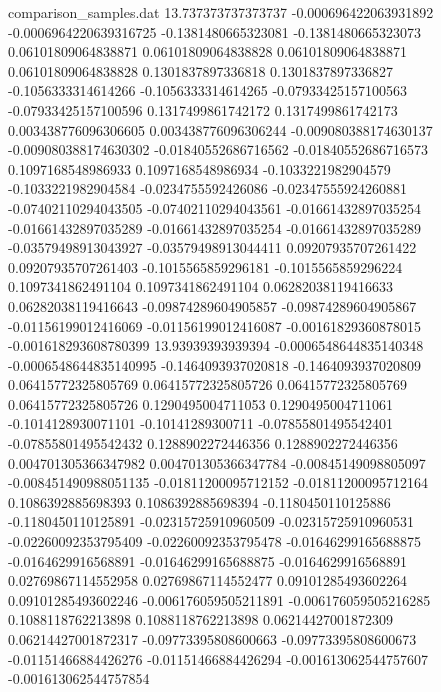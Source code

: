 \begin{filecontents}{comparison_samples.dat}
13.737373737373737  -0.000696422063931892   -0.0006964220639316725  -0.1381480665323081    -0.1381480665323073    0.06101809064838871    0.06101809064838828    0.06101809064838871    0.06101809064838828    0.1301837897336818     0.1301837897336827     -0.1056333314614266     -0.1056333314614265     -0.07933425157100563   -0.07933425157100596   0.1317499861742172      0.1317499861742173      0.003438776096306605    0.003438776096306244    -0.009080388174630137   -0.009080388174630302   -0.01840552686716562    -0.01840552686716573    0.1097168548986933      0.1097168548986934      -0.1033221982904579     -0.1033221982904584     -0.0234755592426086    -0.02347555924260881   -0.07402110294043505   -0.07402110294043561   -0.01661432897035254    -0.01661432897035289    -0.01661432897035254    -0.01661432897035289    -0.03579498913043927   -0.03579498913044411   0.09207935707261422     0.09207935707261403     -0.1015565859296181    -0.1015565859296224    0.1097341862491104      0.1097341862491104      0.06282038119416633     0.06282038119416643     -0.09874289604905857   -0.09874289604905867   -0.01156199012416069   -0.01156199012416087   -0.00161829360878015    -0.001618293608780399 
13.93939393939394   -0.0006548644835140348  -0.0006548644835140995  -0.1464093937020818    -0.1464093937020809    0.06415772325805769    0.06415772325805726    0.06415772325805769    0.06415772325805726    0.1290495004711053     0.1290495004711061     -0.1014128930071101     -0.10141289300711       -0.07855801495542401   -0.07855801495542432   0.1288902272446356      0.1288902272446356      0.004701305366347982    0.004701305366347784    -0.00845149098805097    -0.008451490988051135   -0.01811200095712152    -0.01811200095712164    0.1086392885698393      0.1086392885698394      -0.1180450110125886     -0.1180450110125891     -0.02315725910960509   -0.02315725910960531   -0.02260092353795409   -0.02260092353795478   -0.01646299165688875    -0.0164629916568891     -0.01646299165688875    -0.0164629916568891     0.02769867114552958    0.02769867114552477    0.09101285493602264     0.09101285493602246     -0.006176059505211891  -0.006176059505216285  0.1088118762213898      0.1088118762213898      0.06214427001872309     0.06214427001872317     -0.09773395808600663   -0.09773395808600673   -0.01151466884426276   -0.01151466884426294   -0.001613062544757607   -0.001613062544757854 

\end{filecontents}
